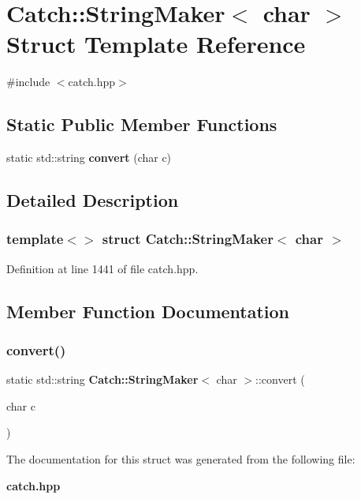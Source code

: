 \section{Catch\+::String\+Maker$<$ char $>$ Struct Template Reference}
\label{struct_catch_1_1_string_maker_3_01char_01_4}


{\ttfamily \#include $<$catch.\+hpp$>$}

\subsection*{Static Public Member Functions}
\begin{DoxyCompactItemize}
\item 
static std\+::string \textbf{ convert} (char c)
\end{DoxyCompactItemize}


\subsection{Detailed Description}
\subsubsection*{template$<$$>$\newline
struct Catch\+::\+String\+Maker$<$ char $>$}



Definition at line 1441 of file catch.\+hpp.



\subsection{Member Function Documentation}
\mbox{\label{struct_catch_1_1_string_maker_3_01char_01_4_a4e3db69a12bb83f3ef89251893e65da5}} 
\subsubsection{convert()}
{\footnotesize\ttfamily static std\+::string \textbf{ Catch\+::\+String\+Maker}$<$ char $>$\+::convert (\begin{DoxyParamCaption}\item[{char}]{c }\end{DoxyParamCaption})\hspace{0.3cm}{\ttfamily [static]}}



The documentation for this struct was generated from the following file\+:\begin{DoxyCompactItemize}
\item 
\textbf{ catch.\+hpp}\end{DoxyCompactItemize}
